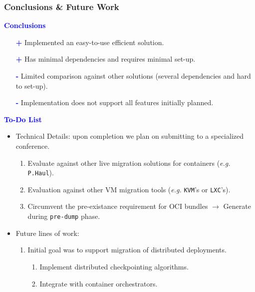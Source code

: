 \documentclass[9pt,    %
    english,            %
    xcolor=table,       %
    envcountsect,        %
    aspectratio=169     %
]{beamer}
\begin{document}
\begin{frame}
    \frametitle{Conclusions \& Future Work}

    \textbf{\textcolor{blue}{Conclusions}}
    \begin{itemize}
        \item[\textcolor{blue}{\textbf{+}}] Implemented an easy-to-use efficient solution.
        \item[\textcolor{blue}{\textbf{+}}] Has minimal dependencies and requires minimal set-up.
        \item[\textcolor{blue}{\textbf{-}}] Limited comparison against other solutions (several dependencies and hard to set-up).
        \item[\textcolor{blue}{\textbf{-}}] Implementation does not support all features initially planned.
    \end{itemize}

    \textbf{\textcolor{blue}{To-Do List}}
    \begin{itemize}
        \item Technical Details: upon completion we plan on submitting to a specialized conference.
        \begin{enumerate}
            \item Evaluate against other live migration solutions for containers (\textit{e.g.} \texttt{P.Haul}).\\[3pt]
            \item Evaluation against other VM migration tools (\textit{e.g.} \texttt{KVM}'s or \texttt{LXC}'s).\\[3pt]
            \item Circumvent the pre-existance requirement for OCI bundles $\rightarrow$ Generate during \texttt{pre-dump} phase.\\[3pt]
        \end{enumerate}
        \item Future lines of work:
        \begin{enumerate}
            \item Initial goal was to support migration of distributed deployments.
            \begin{enumerate}
                \item Implement distributed checkpointing algorithms.\\[3pt]
                \item Integrate with container orchestrators.
            \end{enumerate}
        \end{enumerate}
    \end{itemize}

\end{frame}
\end{document}
